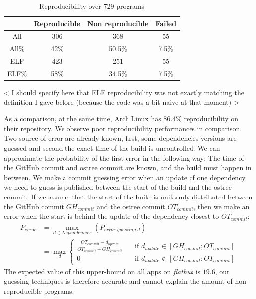 \documentclass[a4paper,11pt,oneside]{report}
\newcommand{\fh}{\emph{flathub}\xspace}
\begin{document}
\begin{table}[h]
    \centering
        \begin{tabular}{|c|c|c|c|}
            \hline
            & Reproducible & Non reproducible & Failed\\
            \hline
            All & 306 & 368 & 55\\
            \hline
            All\% & 42\% & 50.5\% & 7.5\% \\
            \hline
            ELF & 423 & 251 & 55\\
            \hline
            ELF\% & 58\% & 34.5\% & 7.5\% \\
            \hline
        \end{tabular}
    \caption{Reproducibility over 729 programs}
    \label{tab:rebuild-all}
\end{table}

< I should specify here that ELF reproducibility was not exactly matching the definition I gave before (because the code was a bit naive at that moment) >

As a comparison, at the same time, Arch Linux has 86.4\% reproducibility on
their repository\cite{arch-rebuilderd}. We observe poor reproducibility
performances in comparison. Two source of error are already known, first, some
dependencies versions are guessed and second the exact time of the build is
uncontrolled. We can approximate the probability of the first error in the
following way: The time of the GitHub commit and ostree commit are known, and
the build must happen in between. We make a commit guessing error when an
update of one dependency we need to guess is published between the start of the
build and the ostree commit. If we assume that the start of the build is
uniformly distributed between the GitHub commit $GH_{commit}$ and the ostree
commit $OT_{commit}$, then we make an error when the start is behind the update
of the dependency closest to $OT_{commit}$:
\begin{align}
    P_{error} &= \max_{d \in Dependencies}(P_{error\_guessing\_d}) \\
              &= \max_{d}
              \begin{cases}
                \frac{OT_{commit} - d_{update}}{OT_{commit} -
                    GH_{commit}}  & \quad \text{if } d_{update}
                    \in [GH_{commit}; OT_{commit}] \\
                0  & \quad \text{if } d_{update}
                  \notin [GH_{commit}; OT_{commit}]
              \end{cases}
\end{align}
The expected value of this upper-bound on all apps on \fh is $19.6$, our
guessing techniques is therefore accurate and cannot explain the amount of
non-reproducible programs.
\end{document}
